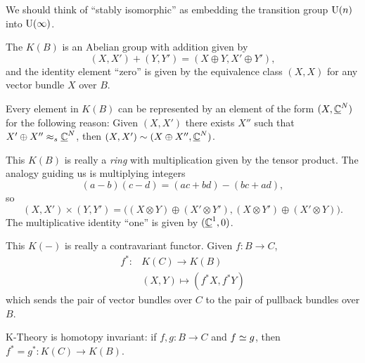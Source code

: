 \begin{remark}
We should think of ``stably isomorphic'' as embedding the transition
group $\operatorname{U}(n)$ into $\operatorname{U}(\infty)$.
\end{remark}

\begin{remark}
The $K(B)$ is an Abelian group with addition given by
\begin{equation}
(X,X')+(Y,Y')=(X\oplus Y,X'\oplus Y'),
\end{equation}
and the identity element ``zero'' is given by the equivalence class
$(X,X)$ for any vector bundle $X$ over $B$.
\end{remark}

\begin{remark}
Every element in $K(B)$ can be represented by an element of the form
$(X,\underline{\mathbb{C}}^{N})$ for the following reason: Given $(X,X')$
there exists $X''$ such that $X'\oplus X''\mathrel{\approx_{s}}\underline{\mathbb{C}}^{N}$,
then $(X,X')\sim(X\oplus X'',\underline{\mathbb{C}}^{N})$.
\end{remark}

\begin{remark}
This $K(B)$ is really a \emph{ring} with multiplication given by the
tensor product. The analogy guiding us is multiplying integers
\begin{equation}
(a-b)(c-d)=(ac+bd)-(bc+ad),
\end{equation}
so
\begin{equation}
(X,X')\times(Y,Y')=\bigl((X\otimes Y)\oplus(X'\otimes Y'),(X\otimes Y')\oplus(X'\otimes Y)\bigr).
\end{equation}
The multiplicative identity ``one'' is given by $(\underline{\mathbb{C}}^{1},0)$.
\end{remark}

\begin{remark}
This $K(-)$ is really a contravariant functor. Given $f\colon B\to C$,
\begin{equation}
\begin{split}
f^{*}\colon & K(C)\to K(B)\\
& (X,Y)\mapsto(f^{*}X,f^{*}Y)
\end{split}
\end{equation}
which sends the pair of vector bundles over $C$ to the pair of
pullback bundles over $B$.
\end{remark}

\begin{fact}
K-Theory is homotopy invariant: if $f,g\colon B\to C$ and $f\simeq g$,
then $f^{*}=g^{*}\colon K(C)\to K(B)$.
\end{fact}

